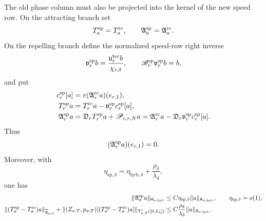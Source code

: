 \begin{theorem}
The old phase column must also be projected into the kernel of the new
speed row.  On the attracting branch set
\begin{equation}
 T_a^{\rm sp}=T_a^{\rm rc},\qquad
 \mathfrak A_a^{\rm sp}=\mathfrak A_a^{\rm rc}.             \label{eq:speed-projected-phase-attracting}
\end{equation}
On the repelling branch define the normalized speed-row right inverse
\begin{equation}
 \mathfrak v_r^{\rm sp}b
 =\frac{\mathfrak u_r^{\rm ter}b}{\chi_{r,\delta}},
 \qquad
 \mathscr B_r^{\rm sp}\mathfrak v_r^{\rm sp}b=b,            \label{eq:speed-row-right-inverse}
\end{equation}
and put
\begin{align}
 c_r^{\rm sp}[a]
 &=\varepsilon(\mathfrak A_r^{\rm rc}a)(e_{r,1}),\notag\\
 T_r^{\rm sp}a
 &=T_r^{\rm rc}a-\mathfrak v_r^{\rm sp}c_r^{\rm sp}[a],
                                                               \label{eq:speed-projected-phase-column}\\
 \mathfrak A_r^{\rm sp}a
 &=\mathfrak D_rT_r^{\rm sp}a+\mathscr P_{c,r,N}a
  =\mathfrak A_r^{\rm rc}a
       -\mathfrak D_r\mathfrak v_r^{\rm sp}c_r^{\rm sp}[a].
                                                               \label{eq:speed-projected-phase-action}
\end{align}
Thus
\begin{equation}
 (\mathfrak A_r^{\rm sp}a)(e_{r,1})=0.           \label{eq:speed-projected-phase-kernel}
\end{equation}
Moreover, with
\begin{equation}
 \eta_{\mathrm{sp},\delta}
 =\eta_{\mathrm{hyb},\delta}
      +\frac{\rho_\delta}{\lambda_\delta},                 \label{eq:speed-projected-phase-small-number}
\end{equation}
one has
\begin{align}
 \|\mathfrak A_\sigma^{\rm sp}a\|_
       {\mathsf H_{\sigma,\mathrm{hyb}}}
 &\le C\eta_{\mathrm{sp},\delta}
       \|a\|_{\mathsf A_{\sigma,\mathrm{hyb}}},
 \qquad \eta_{\mathrm{sp},\delta}=o(1),\notag\\
 \|(T_\sigma^{\rm sp}-T_\sigma^{\rm rc})a\|_
       {\widetilde{\mathsf X}_{\sigma,0}}
 +\|(Z_{\sigma,T},p_{\sigma,T})
       [(T_\sigma^{\rm sp}-T_\sigma^{\rm rc})a]\|_
       {\mathsf T_{\sigma,T}^1([0,L_b])}
 &\le C\frac{\rho_\delta}{\lambda_\delta}
       \|a\|_{\mathsf A_{\sigma,\mathrm{hyb}}}.             \label{eq:speed-projected-phase-bounds}
\end{align}


\end{theorem}
